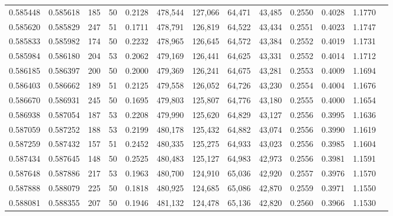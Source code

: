 \begin{tabular}{rrrrrrrrrrrrr}
0.585448 & 0.585618 &   185 &  50 &                                     0.2128 & 478,544 & 127,066 &  64,471 &  43,485 & 0.2550 & 0.4028 & 1.1770 \\
0.585620 & 0.585829 &   247 &  51 &                                     0.1711 & 478,791 & 126,819 &  64,522 &  43,434 & 0.2551 & 0.4023 & 1.1747 \\
0.585833 & 0.585982 &   174 &  50 &                                     0.2232 & 478,965 & 126,645 &  64,572 &  43,384 & 0.2552 & 0.4019 & 1.1731 \\
0.585984 & 0.586180 &   204 &  53 &                                     0.2062 & 479,169 & 126,441 &  64,625 &  43,331 & 0.2552 & 0.4014 & 1.1712 \\
0.586185 & 0.586397 &   200 &  50 &                                     0.2000 & 479,369 & 126,241 &  64,675 &  43,281 & 0.2553 & 0.4009 & 1.1694 \\
0.586403 & 0.586662 &   189 &  51 &                                     0.2125 & 479,558 & 126,052 &  64,726 &  43,230 & 0.2554 & 0.4004 & 1.1676 \\
0.586670 & 0.586931 &   245 &  50 &                                     0.1695 & 479,803 & 125,807 &  64,776 &  43,180 & 0.2555 & 0.4000 & 1.1654 \\
0.586938 & 0.587054 &   187 &  53 &                                     0.2208 & 479,990 & 125,620 &  64,829 &  43,127 & 0.2556 & 0.3995 & 1.1636 \\
0.587059 & 0.587252 &   188 &  53 &                                     0.2199 & 480,178 & 125,432 &  64,882 &  43,074 & 0.2556 & 0.3990 & 1.1619 \\
0.587259 & 0.587432 &   157 &  51 &                                     0.2452 & 480,335 & 125,275 &  64,933 &  43,023 & 0.2556 & 0.3985 & 1.1604 \\
0.587434 & 0.587645 &   148 &  50 &                                     0.2525 & 480,483 & 125,127 &  64,983 &  42,973 & 0.2556 & 0.3981 & 1.1591 \\
0.587648 & 0.587886 &   217 &  53 &                                     0.1963 & 480,700 & 124,910 &  65,036 &  42,920 & 0.2557 & 0.3976 & 1.1570 \\
0.587888 & 0.588079 &   225 &  50 &                                     0.1818 & 480,925 & 124,685 &  65,086 &  42,870 & 0.2559 & 0.3971 & 1.1550 \\
0.588081 & 0.588355 &   207 &  50 &                                     0.1946 & 481,132 & 124,478 &  65,136 &  42,820 & 0.2560 & 0.3966 & 1.1530 \\

\end{tabular}
